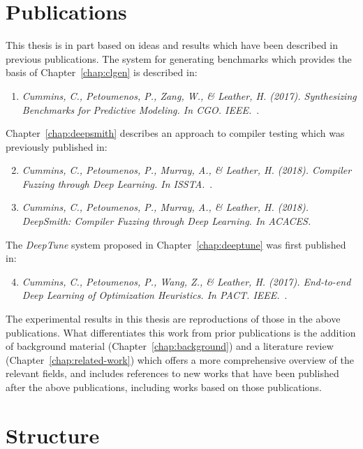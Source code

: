 \begin{itemize}
\end{itemize}

\newpage
\section{Publications}

This thesis is in part based on ideas and results which have been described in previous publications. The system for generating benchmarks which provides the basis of Chapter~\ref{chap:clgen} is described in:
\begin{enumerate}
  \item \emph{Cummins, C., Petoumenos, P., Zang, W., \& Leather, H. (2017). Synthesizing Benchmarks for Predictive Modeling. In CGO. IEEE.}~\cite{Cummins2017a}.
\end{enumerate}

\noindent
Chapter~\ref{chap:deepsmith} describes an approach to compiler testing which was previously published in:
\begin{enumerate}
  \setcounter{enumi}{1}
  \item \emph{Cummins, C., Petoumenos, P., Murray, A., \& Leather, H. (2018). Compiler Fuzzing through Deep Learning. In ISSTA.}~\cite{Cummins2017a}.
  \item \emph{Cummins, C., Petoumenos, P., Murray, A., \& Leather, H. (2018). DeepSmith: Compiler Fuzzing through Deep Learning. In ACACES.~\cite{Cummins2018a}}
\end{enumerate}

\noindent
The \emph{DeepTune} system proposed in Chapter~\ref{chap:deeptune} was first published in:
\begin{enumerate}
  \setcounter{enumi}{3}
  \item \emph{Cummins, C., Petoumenos, P., Wang, Z., \& Leather, H. (2017). End-to-end Deep Learning of Optimization Heuristics. In PACT. IEEE.}~\cite{Cummins2017b}.
\end{enumerate}

The experimental results in this thesis are reproductions of those in the above publications. What differentiates this work from prior publications is the addition of background material (Chapter~\ref{chap:background}) and a literature review (Chapter~\ref{chap:related-work}) which offers a more comprehensive overview of the relevant fields, and includes references to new works that have been published after the above publications, including works based on those publications.


\section{Structure}


